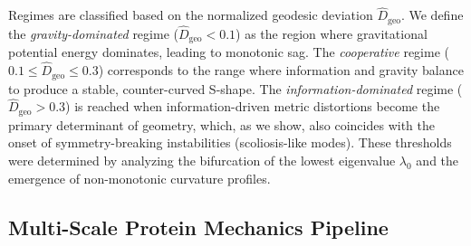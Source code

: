 Regimes are classified based on the normalized geodesic deviation $\widehat{D}_{\mathrm{geo}}$. We define the \emph{gravity-dominated} regime ($\widehat{D}_{\mathrm{geo}} < 0.1$) as the region where gravitational potential energy dominates, leading to monotonic sag. The \emph{cooperative} regime ($0.1 \leq \widehat{D}_{\mathrm{geo}} \leq 0.3$) corresponds to the range where information and gravity balance to produce a stable, counter-curved S-shape. The \emph{information-dominated} regime ($\widehat{D}_{\mathrm{geo}} > 0.3$) is reached when information-driven metric distortions become the primary determinant of geometry, which, as we show, also coincides with the onset of symmetry-breaking instabilities (scoliosis-like modes). These thresholds were determined by analyzing the bifurcation of the lowest eigenvalue $\lambda_0$ and the emergence of non-monotonic curvature profiles.

\subsection{Multi-Scale Protein Mechanics Pipeline}


